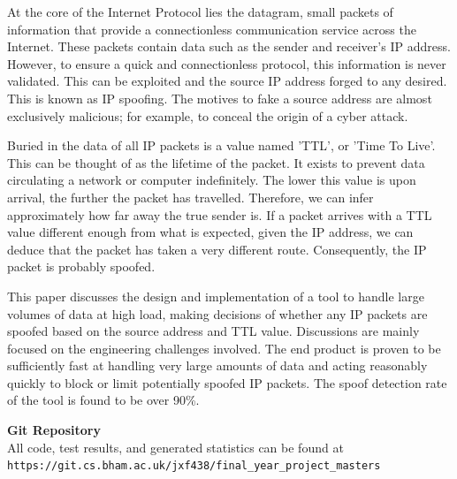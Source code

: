 \documentclass[12pt,twoside]{article}
\begin{document}

At the core of the Internet Protocol lies the datagram, small packets of information that provide a connectionless communication service across the Internet. These packets contain data such as the sender and receiver's IP address. However, to ensure a quick and connectionless protocol, this information is never validated. This can be exploited and the source IP address forged to any desired. This is known as IP spoofing. The motives to fake a source address are almost exclusively malicious; for example, to conceal the origin of a cyber attack. 

Buried in the data of all IP packets is a value named 'TTL', or 'Time To Live'. This can be thought of as the lifetime of the packet. It exists to prevent data circulating a network or computer indefinitely. The lower this value is upon arrival, the further the packet has travelled. Therefore, we can infer approximately how far away the true sender is. If a packet arrives with a TTL value different enough from what is expected, given the IP address, we can deduce that the packet has taken a very different route. Consequently, the IP packet is probably spoofed.

This paper discusses the design and implementation of a tool to handle large volumes of data at high load, making decisions of whether any IP packets are spoofed based on the source address and TTL value. Discussions are mainly focused on the engineering challenges involved. The end product is proven to be sufficiently fast at handling very large amounts of data and acting reasonably quickly to block or limit potentially spoofed IP packets. The spoof detection rate of the tool is found to be over 90\%.

\vspace{2.5cm}

\begin{center}
	\textbf{Git Repository} \\
All code, test results, and generated statistics can be found at \\ \texttt{https://git.cs.bham.ac.uk/jxf438/final\_year\_project\_masters}
\vspace{2.5cm}
\end{center}
\end{document}
